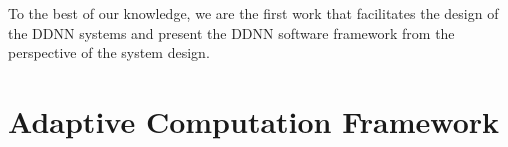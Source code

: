 \documentclass[format=acmsmall, review=false, screen=true]{acmart}
\begin{document}
To the best of our knowledge, we are the first work that facilitates the design of the DDNN systems and present the DDNN software framework from the perspective of the system design. %

\section{Adaptive Computation Framework}
\label{sec:framework}


\end{document}
